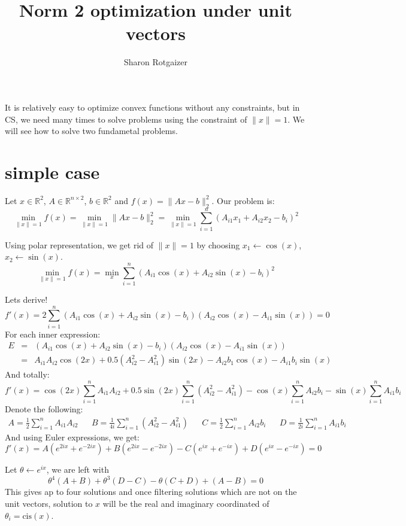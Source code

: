 \documentclass[12pt, a4paper]{article}
\title{Norm 2 optimization under unit vectors}
\newcommand{\norm}[1]{\lVert #1 \rVert}
\newcommand{\double}[1]{\mathbb{#1}}
\begin{document}
\author{Sharon Rotgaizer}
\maketitle


It is relatively easy to optimize convex functions without any constraints, but in CS, we need many times to solve problems using the constraint of $\norm{x}=1$. We will see how to solve two fundametal problems.

\section{simple case}
Let $x\in\double{R}^2$, $A\in\double{R}^{n\times 2}$, $b\in\double{R}^2$ and $f(x)=\norm{Ax-b}_2^2$. Our problem is:
\[\min_{\norm{x}=1} f(x)=\min_{\norm{x}=1} \norm{Ax-b}_2^2=\min_{\norm{x}=1} \sum_{i=1}^n (A_{i1}x_1+A_{i2}x_2-b_i)^2\]

Using polar representation, we get rid of $\norm{x}=1$ by choosing $x_1\leftarrow \cos(x)$, $x_2\leftarrow \sin(x)$.
\[\min_{\norm{x}=1} f(x)=\min_x \sum_{i=1}^n (A_{i1}\cos(x)+A_{i2}\sin(x)-b_i)^2\]

Lets derive!
\[f'(x)=2\sum_{i=1}^n (A_{i1}\cos(x)+A_{i2}\sin(x)-b_i)(A_{i2}\cos(x)-A_{i1}\sin(x))=0\]
For each inner expression:
\begin{eqnarray*}
    E&=&(A_{i1}\cos(x)+A_{i2}\sin(x)-b_i)(A_{i2}\cos(x)-A_{i1}\sin(x))\\
    &=&A_{i1}A_{i2}\cos(2x)+0.5(A_{i2}^2-A_{i1}^2)\sin(2x)-A_{i2}b_1\cos(x)-A_{i1}b_i\sin(x)
\end{eqnarray*}
And totally:
\[f'(x)=\cos(2x)\sum_{i=1}^n A_{i1}A_{i2}+0.5\sin(2x)\sum_{i=1}^n (A_{i2}^2-A_{i1}^2)-\cos(x)\sum_{i=1}^n A_{i2}b_i-\sin(x)\sum_{i=1}^n A_{i1}b_i\]
Denote the following:
\[\begin{matrix}
    A=\frac{1}{2}\sum_{i=1}^n A_{i1}A_{i2} && B=\frac{1}{4i}\sum_{i=1}^n (A_{i2}^2-A_{i1}^2) && C=\frac{1}{2}\sum_{i=1}^n A_{i2}b_i&& D=\frac{1}{2i}\sum_{i=1}^n A_{i1}b_i
\end{matrix}\]
And using Euler expressions, we get:
\[f'(x)=A(e^{2ix}+e^{-2ix})+B(e^{2ix}-e^{-2ix})-C(e^{ix}+e^{-ix})+D(e^{ix}-e^{-ix})=0\]

Let $\theta\leftarrow e^{ix}$, we are left with 
\[\theta^4 (A+B)+\theta^3 (D-C) -\theta (C+D) + (A-B)=0\]
This gives ap to four solutions and once filtering solutions which are not on the unit vectors, solution to $x$ will be the real and imaginary coordinated of $\theta_i=\text{cis}(x)$.
\end{document}
